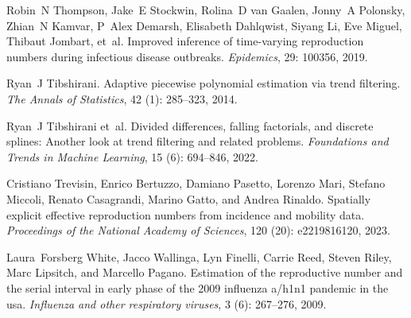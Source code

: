 \documentclass[10pt,letterpaper]{article}
\begin{document}
\begin{thebibliography}{32}
  Robin~N Thompson, Jake~E Stockwin, Rolina~D van Gaalen, Jonny~A Polonsky,
    Zhian~N Kamvar, P~Alex Demarsh, Elisabeth Dahlqwist, Siyang Li, Eve Miguel,
    Thibaut Jombart, et~al.
  \newblock Improved inference of time-varying reproduction numbers during
    infectious disease outbreaks.
  \newblock \emph{Epidemics}, 29: 100356, 2019.
  
  Ryan~J Tibshirani.
  \newblock Adaptive piecewise polynomial estimation via trend filtering.
  \newblock \emph{The Annals of Statistics}, 42 (1): 285--323,
    2014.
  
  Ryan~J Tibshirani et~al.
  \newblock Divided differences, falling factorials, and discrete splines:
    Another look at trend filtering and related problems.
  \newblock \emph{Foundations and Trends{\textregistered} in Machine Learning},
    15 (6): 694--846, 2022.
  
  Cristiano Trevisin, Enrico Bertuzzo, Damiano Pasetto, Lorenzo Mari, Stefano
    Miccoli, Renato Casagrandi, Marino Gatto, and Andrea Rinaldo.
  \newblock Spatially explicit effective reproduction numbers from incidence and
    mobility data.
  \newblock \emph{Proceedings of the National Academy of Sciences}, 120
    (20): e2219816120, 2023.
  
  Laura~Forsberg White, Jacco Wallinga, Lyn Finelli, Carrie Reed, Steven Riley,
    Marc Lipsitch, and Marcello Pagano.
  \newblock Estimation of the reproductive number and the serial interval in
    early phase of the 2009 influenza a/h1n1 pandemic in the usa.
  \newblock \emph{Influenza and other respiratory viruses}, 3
    (6): 267--276, 2009.
  
  \end{thebibliography}

  
%
\end{document}
